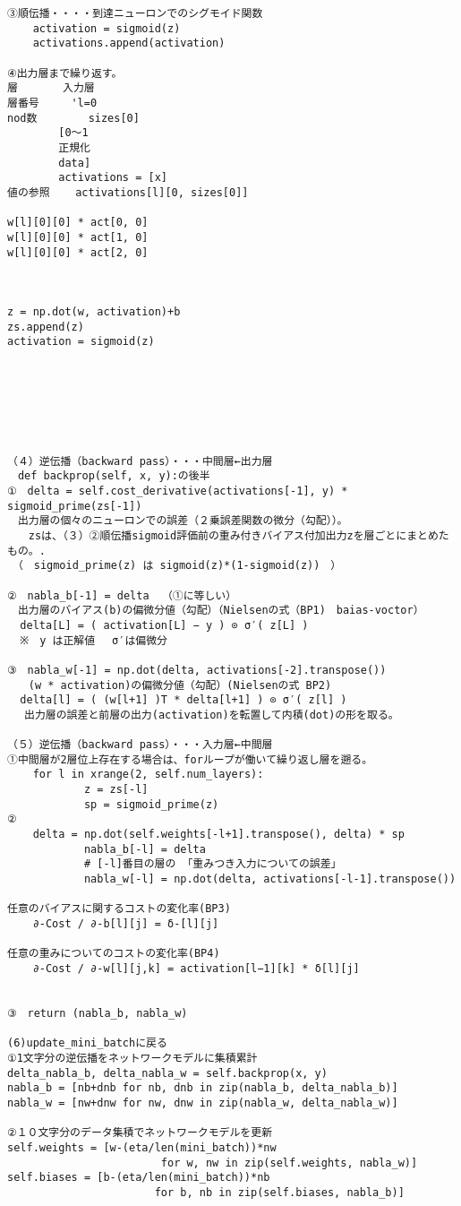 \documentclass[11pt,a4j,fleqn]{jarticle}
\begin{document}
\begin{verbatim}
③順伝播・・・・到達ニューロンでのシグモイド関数
	activation = sigmoid(z)
	activations.append(activation)

④出力層まで繰り返す。
層		入力層
層番号		'l=0
nod数		sizes[0]
		[0〜1
		正規化
		data]
		activations = [x]
値の参照	activations[l][0, sizes[0]]

w[l][0][0] * act[0, 0]
w[l][0][0] * act[1, 0]
w[l][0][0] * act[2, 0]



z = np.dot(w, activation)+b
zs.append(z)
activation = sigmoid(z)







（４）逆伝播（backward pass）・・・中間層←出力層
　def backprop(self, x, y):の後半
①　delta = self.cost_derivative(activations[-1], y) * sigmoid_prime(zs[-1]) 
　出力層の個々のニューロンでの誤差（２乗誤差関数の微分（勾配））。
　　zsは、（３）②順伝播sigmoid評価前の重み付きバイアス付加出力zを層ごとにまとめたもの。.
　（　sigmoid_prime(z) は sigmoid(z)*(1-sigmoid(z))　）

②　nabla_b[-1] = delta  （①に等しい）
　出力層のバイアス(b)の偏微分値（勾配）（Nielsenの式（BP1)　baias-voctor）
  delta[L] = ( activation[L] − y ) ⊙ σ′( z[L] )
  ※　y は正解値　 σ′は偏微分　

③　nabla_w[-1] = np.dot(delta, activations[-2].transpose()) 
　　(w * activation)の偏微分値（勾配）(Nielsenの式 BP2)
  delta[l] = ( (w[l+1] )T * delta[l+1] ) ⊙ σ′( z[l] )
　 出力層の誤差と前層の出力(activation)を転置して内積(dot)の形を取る。

（５）逆伝播（backward pass）・・・入力層←中間層
①中間層が2層位上存在する場合は、forループが働いて繰り返し層を遡る。
	for l in xrange(2, self.num_layers):
            z = zs[-l]
            sp = sigmoid_prime(z)
②
	delta = np.dot(self.weights[-l+1].transpose(), delta) * sp
            nabla_b[-l] = delta
            # [-l]番目の層の 「重みつき入力についての誤差」
            nabla_w[-l] = np.dot(delta, activations[-l-1].transpose())

任意のバイアスに関するコストの変化率(BP3)
	∂-Cost / ∂-b[l][j] = δ-[l][j]

任意の重みについてのコストの変化率(BP4)
	∂-Cost / ∂-w[l][j,k] = activation[l−1][k] * δ[l][j]


③　return (nabla_b, nabla_w)

(6)update_mini_batchに戻る
①1文字分の逆伝播をネットワークモデルに集積累計
delta_nabla_b, delta_nabla_w = self.backprop(x, y)
nabla_b = [nb+dnb for nb, dnb in zip(nabla_b, delta_nabla_b)]
nabla_w = [nw+dnw for nw, dnw in zip(nabla_w, delta_nabla_w)]

②１０文字分のデータ集積でネットワークモデルを更新
self.weights = [w-(eta/len(mini_batch))*nw
                        for w, nw in zip(self.weights, nabla_w)]
self.biases = [b-(eta/len(mini_batch))*nb
                       for b, nb in zip(self.biases, nabla_b)]
\end{verbatim}
\end{document}
